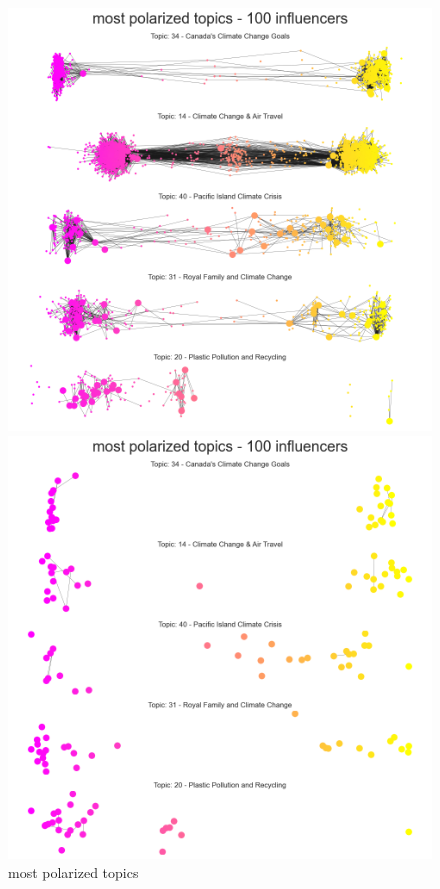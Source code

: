 \begin{figure}[H]
    \centering
    \begin{minipage}{0.50\textwidth}
        \centering
         \includegraphics[width=0.98\linewidth]{Chapter5//figures/most_pol_cop26.png}
        \caption{most polarized topics}
    \end{minipage}\hfill
    \begin{minipage}{0.50\textwidth}
        \centering
         \includegraphics[width=0.98\linewidth]{Chapter5//figures/most_pol_cop26_inf.png}

\end{minipage}
\end{figure}
